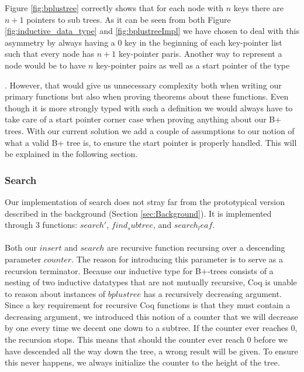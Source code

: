 Figure \ref{fig:bplustree} correctly shows that for each node with $n$ keys there are $n+1$ pointers to sub trees. As it can be seen from both Figure \ref{fig:inductive_data_type} and \ref{fig:bplustreeImpl} we have chosen to deal with this asymmetry by always having a $0$ key in the beginning of each key-pointer list such that every node has $n+1$ key-pointer paris. Another way to represent a node would be to have $n$ key-pointer pairs as well as a start pointer of the type \begin{coqdoccode}  \end{coqdoccode}. However, that would give us unnecessary complexity both when writing our primary functions but also when proving theorems about these functions. Even though it is more strongly typed with such a definition we would always have to take care of a start pointer corner case when proving anything about our B+ trees. With our current solution we add a couple of assumptions to our notion of what a valid B+ tree is, to ensure the start pointer is properly handled. This will be explained in the following section. 

\paragraph{}

\paragraph{}

\subsubsection{Search}
Our implementation of search does not stray far from the prototypical version described in the background (Section \ref{sec:Background}). It is implemented through 3 functions: $search'$, $find_subtree$, and $search_leaf$. 

\paragraph{}
Both our $insert$ and $search$ are recursive function recursing over a descending parameter $counter$. The reason for introducing this parameter is to serve as a recursion terminator. Because our inductive type for B+-trees consists of a nesting of two inductive datatypes that are not mutually recursive, Coq is unable to reason about instances of $bplustree$ has a recursively decreasing argument. Since a key requirement for recursive Coq functions is that they must contain a decreasing argument, we introduced this notion of a counter that we will decrease by one every time we decent one down to a subtree. If the counter ever reaches $0$, the recursion stops. This means that should the counter ever reach $0$ before we have descended all the way down the tree, a wrong result will be given. To ensure this never happens, we always initialize the counter to the height of the tree.

